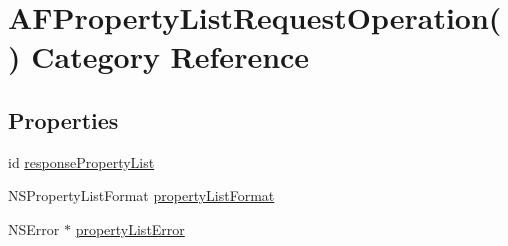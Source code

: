 \hypertarget{category_a_f_property_list_request_operation_07_08}{\section{A\-F\-Property\-List\-Request\-Operation() Category Reference}
\label{category_a_f_property_list_request_operation_07_08}
}
\subsection*{Properties}
\begin{DoxyCompactItemize}
\item 
id \hyperlink{category_a_f_property_list_request_operation_07_08_a49f4f05444c9c574df1862cb90af5a31}{response\-Property\-List}
\item 
N\-S\-Property\-List\-Format \hyperlink{category_a_f_property_list_request_operation_07_08_a4c1875d3d50ae35f4e95074e83fcbfcc}{property\-List\-Format}
\item 
N\-S\-Error $\ast$ \hyperlink{category_a_f_property_list_request_operation_07_08_a8a5b1afc8ac2ac7214d3e5c671339d13}{property\-List\-Error}
\end{DoxyCompactItemize}


